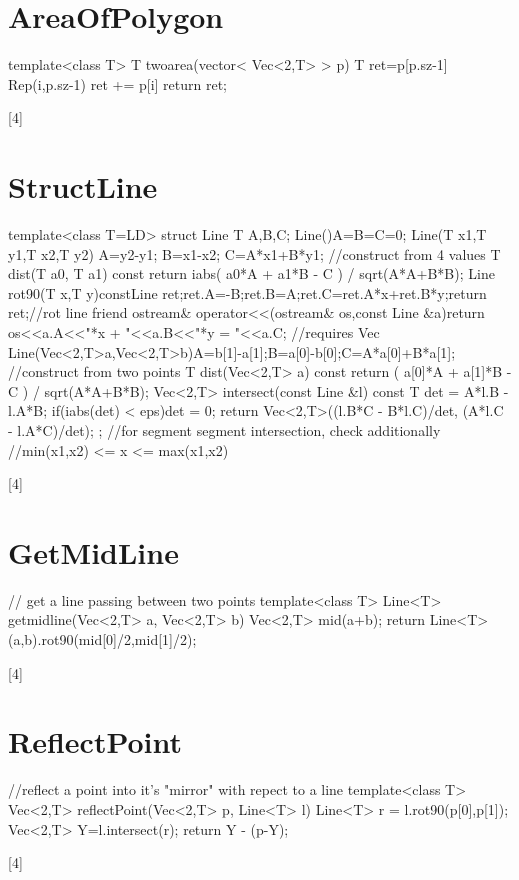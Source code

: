 \documentclass[a4paper,9pt]{article}
\begin{document}
\section{AreaOfPolygon}
\begin{verbatimtab}[4]
	template<class T> T twoarea(vector< Vec<2,T> > p) {
		T ret=p[p.sz-1]%
		Rep(i,p.sz-1) ret += p[i]%
		return ret;
	}
\end{verbatimtab}[4]

\section{StructLine}
\begin{verbatimtab}[4]
	template<class T=LD> struct Line {
		T A,B,C;
		Line(){A=B=C=0;}
		Line(T x1,T y1,T x2,T y2) { A=y2-y1; B=x1-x2; C=A*x1+B*y1; }//construct from 4 values
		T dist(T a0, T a1) const { return iabs( a0*A + a1*B - C ) / sqrt(A*A+B*B); }
		Line rot90(T x,T y)const{Line ret;ret.A=-B;ret.B=A;ret.C=ret.A*x+ret.B*y;return ret;}//rot line
		friend ostream& operator<<(ostream& os,const Line &a){return os<<a.A<<"*x + "<<a.B<<"*y = "<<a.C; }
		//requires Vec
		Line(Vec<2,T>a,Vec<2,T>b){A=b[1]-a[1];B=a[0]-b[0];C=A*a[0]+B*a[1];} //construct from two points
		T dist(Vec<2,T> a) const { return ( a[0]*A + a[1]*B - C ) / sqrt(A*A+B*B); }
		Vec<2,T> intersect(const Line &l) const {T det = A*l.B - l.A*B; if(iabs(det) < eps)det = 0;
				return Vec<2,T>((l.B*C - B*l.C)/det, (A*l.C - l.A*C)/det); }
	};
	//for segment segment intersection, check additionally
	//min(x1,x2) <= x <= max(x1,x2)
\end{verbatimtab}[4]

\section{GetMidLine}
\begin{verbatimtab}[4]
	// get a line passing between two points
	template<class T>
	Line<T> getmidline(Vec<2,T> a, Vec<2,T> b) {
		Vec<2,T> mid(a+b);
		return Line<T>(a,b).rot90(mid[0]/2,mid[1]/2);
	}
\end{verbatimtab}[4]

\section{ReflectPoint}
\begin{verbatimtab}[4]
	//reflect a point into it's "mirror" with repect to a line
	template<class T>
	Vec<2,T> reflectPoint(Vec<2,T> p, Line<T> l) {
		Line<T> r = l.rot90(p[0],p[1]);
		Vec<2,T> Y=l.intersect(r);
		return Y - (p-Y);
	}
\end{verbatimtab}[4]
\end{document}
